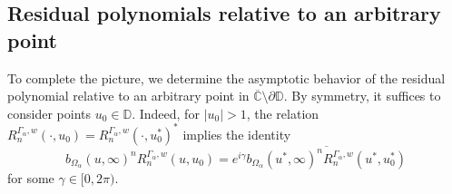 \documentclass[12pt,oneside,reqno]{amsart}
\theoremstyle{definition}
\numberwithin{equation}{section}
\newcommand{\R}{{\mathbb R}}
\newcommand{\C}{{\mathbb C}}
\newcommand{\D}{{\mathbb D}}
\begin{document}


\subsection{Residual polynomials relative to an arbitrary point}

To complete the picture, we determine the asymptotic behavior of the residual polynomial relative to an arbitrary point in $\overline{\C}\setminus\partial\D$. By symmetry, it suffices to consider points $u_0\in\D$. Indeed, for $|u_0|>1$, the relation $R_{n}^{\Gamma_\alpha,w}(\cdot,u_0)= R_{n}^{\Gamma_\alpha,w}(\cdot,u_0^\ast)^\ast$ implies the identity 
\begin{equation}b_{\Omega_\alpha}(u,\infty)^n R_{n}^{\Gamma_\alpha,w}(u,u_0) = e^{i\gamma}\overline{b_{\Omega_\alpha}(u^\ast,\infty)^nR_{n}^{\Gamma_\alpha,w}(u^\ast,u_0^\ast)}
	\label{eq:reflection_formula}
\end{equation}
for some $\gamma\in [0,2\pi)$.

\end{document}

